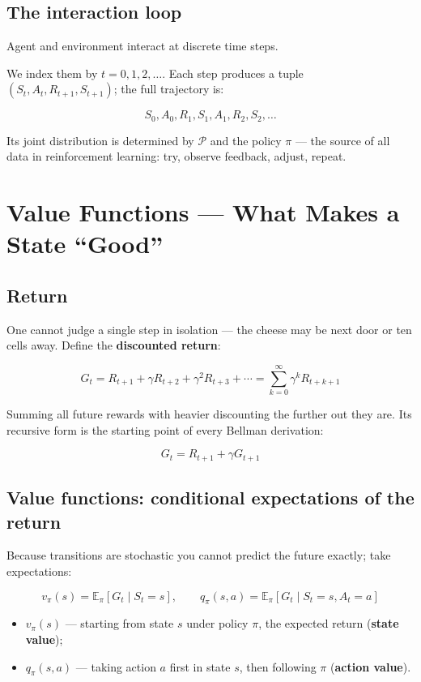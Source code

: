 \documentclass{article}
\begin{document}
\subsection*{The interaction loop}

Agent and environment interact at discrete time steps.

We index them by $t=0,1,2,\ldots$. Each step produces a tuple $(S_t, A_t, R_{t+1}, S_{t+1})$; the full trajectory is:

\[
S_0, A_0, R_1, S_1, A_1, R_2, S_2, \ldots
\]

Its joint distribution is determined by $\mathcal{P}$ and the policy $\pi$ --- the source of all data in reinforcement learning: try, observe feedback, adjust, repeat.

\section*{Value Functions --- What Makes a State ``Good''}

\subsection*{Return}

One cannot judge a single step in isolation --- the cheese may be next door or ten cells away. Define the \textbf{discounted return}:

\[
\boxed{G_t = R_{t+1} + \gamma R_{t+2} + \gamma^2 R_{t+3} + \cdots = \sum_{k=0}^{\infty} \gamma^k R_{t+k+1}}
\]

Summing all future rewards with heavier discounting the further out they are. Its recursive form is the starting point of every Bellman derivation:

\[
\boxed{G_t = R_{t+1} + \gamma G_{t+1}}
\]

\subsection*{Value functions: conditional expectations of the return}

Because transitions are stochastic you cannot predict the future exactly; take expectations:

\[
\boxed{v_\pi(s) = \mathbb{E}_\pi[G_t \mid S_t = s]}, \qquad
\boxed{q_\pi(s,a) = \mathbb{E}_\pi[G_t \mid S_t = s, A_t = a]}
\]

\begin{itemize}
  \item $v_\pi(s)$ --- starting from state $s$ under policy $\pi$, the expected return (\textbf{state value});
  \item $q_\pi(s,a)$ --- taking action $a$ first in state $s$, then following $\pi$ (\textbf{action value}).
\end{itemize}
\end{document}
